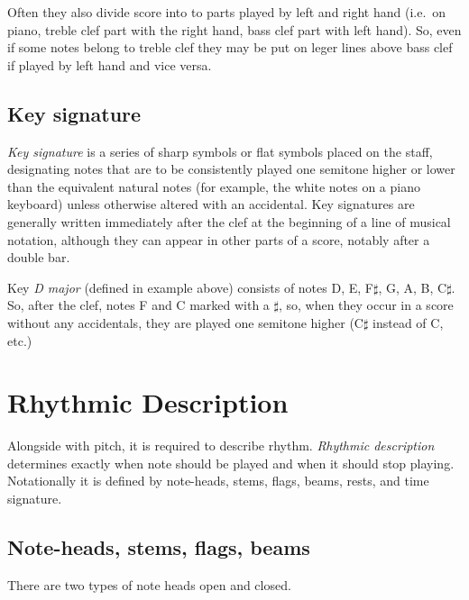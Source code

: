 \figcenter{}

Often they also divide score into to parts played by left and right hand (i.e.\ on piano, treble clef part with
the right hand, bass clef part with left hand). So, even if some notes belong to treble clef they may be put on leger
lines above bass clef if played by left hand and vice versa.

\figcenter{}


\subsection{Key signature}\label{subsec:key-signature}
\textit{Key signature} is a series of sharp symbols or flat symbols placed on the staff, designating notes that are to
be consistently played one semitone higher or lower than the equivalent natural notes (for example, the white notes on
a piano keyboard) unless otherwise altered with an accidental. Key signatures are generally written immediately after
the clef at the beginning of a line of musical notation, although they can appear in other parts of a score, notably
after a double bar.\cite{key-signature}

\figcenter{}

Key \textit{D major} (defined in example above) consists of notes D, E, F$\sharp$, G, A, B,
C$\sharp$. So, after the clef, notes F and C marked with a $\sharp$, so, when they occur in
a score without any accidentals, they are played one semitone higher (C$\sharp$ instead of C, etc.)


\section{Rhythmic Description}\label{sec:rhythmic-description}
Alongside with pitch, it is required to describe rhythm. \textit{Rhythmic description} determines exactly when note
should be played and when it should stop playing. Notationally it is defined by note-heads, stems, flags, beams, rests,
and time signature.

\subsection{Note-heads, stems, flags, beams}\label{subsec:note-heads}

There are two types of note heads open and closed.
\figcenter{}

